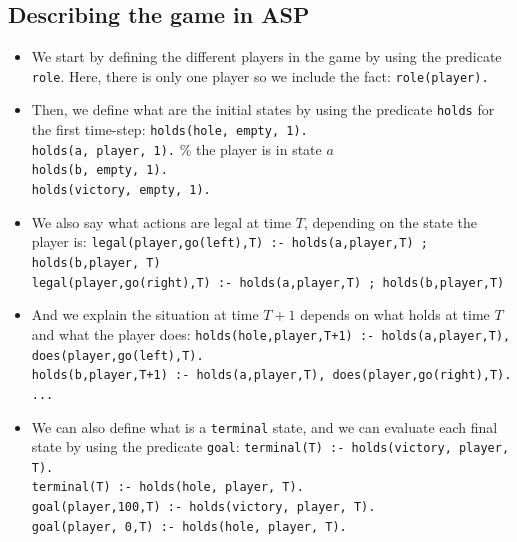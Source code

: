 \subsection{Describing the game in ASP}
\label{subsection:asp_description}
\begin{itemize}

\item We start by defining the different players in the game by using the predicate \texttt{role}. Here, there is only one player so we include the fact: \texttt{role(player).}

\smallskip

\item Then, we define what are the initial states by using the predicate \texttt{holds} for the first time-step:\newline
\texttt{holds(hole, empty, 1).}\\
\texttt{holds(a, player, 1).} \% the player is in state $a$\\
\texttt{holds(b, empty, 1).}\\
\texttt{holds(victory, empty, 1).}

\item We also say what actions are legal at time $T$, depending on the state the player is:\newline
\texttt{legal(player,go(left),T) :- holds(a,player,T) ; holds(b,player, T)}\\
\texttt{legal(player,go(right),T) :- holds(a,player,T) ; holds(b,player,T)}

\item And we explain the situation at time $T+1$ depends on what holds at time $T$ and what the player does:\newline
\texttt{holds(hole,player,T+1) :- holds(a,player,T), does(player,go(left),T).}\\
\texttt{holds(b,player,T+1) :- holds(a,player,T), does(player,go(right),T).}\\
\texttt{...}

\item We can also define what is a \texttt{terminal} state, and we can evaluate each final state by using the predicate \texttt{goal}: \newline
\texttt{terminal(T) :- holds(victory, player, T).}\\
\texttt{terminal(T) :- holds(hole, player, T).}\\
\texttt{goal(player,100,T) :- holds(victory, player, T).}\\
\texttt{goal(player,  0,T) :- holds(hole, player, T).}
\end{itemize}

